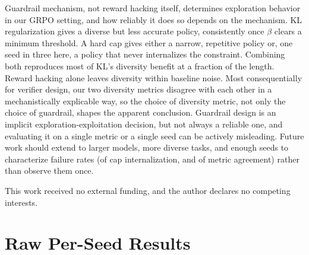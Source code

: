 \documentclass{article}
\begin{document}
Guardrail mechanism, not reward hacking itself, determines exploration behavior in our GRPO setting, and how reliably it does so depends on the mechanism. KL regularization gives a diverse but less accurate policy, consistently once $\beta$ clears a minimum threshold. A hard cap gives either a narrow, repetitive policy or, one seed in three here, a policy that never internalizes the constraint. Combining both reproduces most of KL's diversity benefit at a fraction of the length. Reward hacking alone leaves diversity within baseline noise. Most consequentially for verifier design, our two diversity metrics disagree with each other in a mechanistically explicable way, so the choice of diversity metric, not only the choice of guardrail, shapes the apparent conclusion. Guardrail design is an implicit exploration-exploitation decision, but not always a reliable one, and evaluating it on a single metric or a single seed can be actively misleading. Future work should extend to larger models, more diverse tasks, and enough seeds to characterize failure rates (of cap internalization, and of metric agreement) rather than observe them once.

\begin{ack}
This work received no external funding, and the author declares no competing interests.
\end{ack}




\appendix

\section{Raw Per-Seed Results}
\label{app:raw_data}
\end{document}
